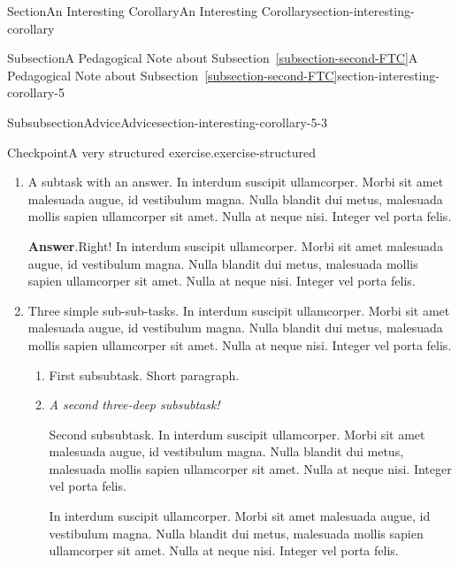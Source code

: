 \documentclass[twoside,10pt,]{article}
\newcommand{\blocktitlefont}{\relax}
\newcommand{\xreffont}{\relax}
\newcommand{\lititle}[1]{{\slshape#1}}
\numberwithin{equation}{section}
\begin{document}
\begin{sectionptx}{Section}{An Interesting Corollary}{}{An Interesting Corollary}{}{}{section-interesting-corollary}
\begin{subsectionptx}{Subsection}{A Pedagogical Note about Subsection~{\xreffont\ref*{subsection-second-FTC}}}{}{A Pedagogical Note about Subsection~{\xreffont\ref*{subsection-second-FTC}}}{}{}{section-interesting-corollary-5}
\begin{subsubsectionptx}{Subsubsection}{Advice}{}{Advice}{}{}{section-interesting-corollary-5-3}
\begin{inlineexercise}{Checkpoint}{A very structured exercise.}{exercise-structured}
\begin{enumerate}[font=\bfseries,label=(\alph*),ref=\alph*]
\begin{enumerate}[font=\bfseries,label=(\roman*),ref=\theenumi.\roman*]
A really simple subtask.  In interdum suscipit ullamcorper. Morbi sit amet malesuada augue, id vestibulum magna. Nulla blandit dui metus, malesuada mollis sapien ullamcorper sit amet. Nulla at neque nisi. Integer vel porta felis.%
\par
A short paragraph, before an answer.%
\par\smallskip%
\noindent\textbf{\blocktitlefont Answer}.\hypertarget{exercise-structured-5-3-3}{}\quad{}With a proof.%
\begin{solutionproof}{Proof}
In interdum suscipit ullamcorper. Morbi sit amet malesuada augue, id vestibulum magna. Nulla blandit dui metus, malesuada mollis sapien ullamcorper sit amet. Nulla at neque nisi. Integer vel porta felis.%
\end{solutionproof}
And a bit more to say.%
\item{}A subtask with an answer.  In interdum suscipit ullamcorper. Morbi sit amet malesuada augue, id vestibulum magna. Nulla blandit dui metus, malesuada mollis sapien ullamcorper sit amet. Nulla at neque nisi. Integer vel porta felis.%
\par\smallskip%
\noindent\textbf{\blocktitlefont Answer}.\hypertarget{exercise-structured-5-4-2}{}\quad{}Right!  In interdum suscipit ullamcorper. Morbi sit amet malesuada augue, id vestibulum magna. Nulla blandit dui metus, malesuada mollis sapien ullamcorper sit amet. Nulla at neque nisi. Integer vel porta felis.%
\item{}Three simple sub-sub-tasks.  In interdum suscipit ullamcorper. Morbi sit amet malesuada augue, id vestibulum magna. Nulla blandit dui metus, malesuada mollis sapien ullamcorper sit amet. Nulla at neque nisi. Integer vel porta felis.%
\begin{enumerate}[font=\bfseries,label=(\Alph*),ref=\theenumi.\theenumii.\Alph*]%
\item{}First subsubtask.  Short paragraph.%
\item{}\lititle{A second three-deep subsubtask!}\par%
Second subsubtask.  In interdum suscipit ullamcorper. Morbi sit amet malesuada augue, id vestibulum magna. Nulla blandit dui metus, malesuada mollis sapien ullamcorper sit amet. Nulla at neque nisi. Integer vel porta felis.%
\par
In interdum suscipit ullamcorper. Morbi sit amet malesuada augue, id vestibulum magna. Nulla blandit dui metus, malesuada mollis sapien ullamcorper sit amet. Nulla at neque nisi. Integer vel porta felis.%

\end{enumerate}
\end{enumerate}
\end{enumerate}
\end{inlineexercise}
\end{subsubsectionptx}
\end{subsectionptx}
\end{sectionptx}
\end{document}
